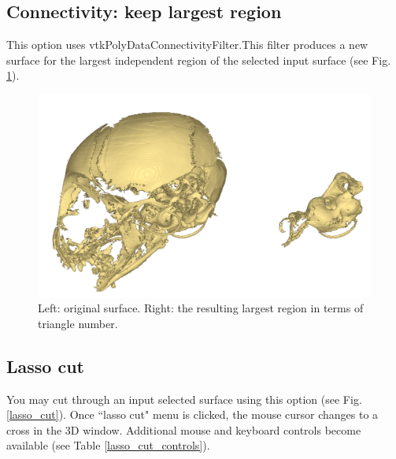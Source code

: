\subsection{Connectivity: keep largest region}
This option uses vtkPolyDataConnectivityFilter.This filter produces a new surface for the largest independent region of the selected input surface (see Fig. \ref{largest_region}).

\begin{figure}
  \centering
  \includegraphics[scale=0.4]{images/Edit_selected_objects/03_Decompose6.png} 
	\caption{Left: original surface. Right: the resulting largest region in terms of triangle number.}
\label{largest_region}
 
\end{figure}


\subsection{Lasso cut}
You may cut through an input selected surface using this option (see Fig. \ref{lasso_cut}). Once ``lasso cut" menu is clicked, the mouse cursor changes to a cross in the 3D window. Additional mouse and keyboard controls become available (see Table \ref{lasso_cut_controls}).

